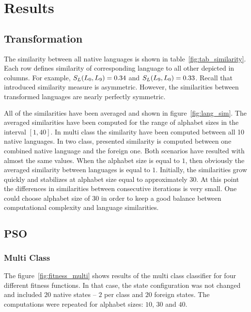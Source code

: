 \documentclass{mini}
\begin{document}
\chapter{Results}\label{chap:results}


\section{Transformation}

The similarity between all native languages is shown in table~\ref{fig:tab_similarity}. Each row defines similarity of corresponding language to all other depicted in columns. For example, $S_{L}(L_0,L_9) = 0.34$ and $S_{L}(L_9,L_0) = 0.33$. Recall that introduced similarity measure is asymmetric. However, the similarities between transformed languages are nearly perfectly symmetric.

\makeTableMutualSimilarites

All of the similarities have been averaged and shown in figure~\ref{fig:lang_sim}. The averaged similarities have been computed for the range of alphabet sizes in the interval $[1, 40]$. In multi class the similarity have been computed between all 10 native languages. In two class, presented similarity is computed between one combined native language and the foreign one. Both scenarios have resulted with almost the same values. When the alphabet size is equal to $1$, then obviously the averaged similarity between languages is equal to $1$. Initially, the similarities grow quickly and stabilizes at alphabet size equal to approximately $30$. At this point the differences in similarities between consecutive iterations is very small. One could choose alphabet size of $30$ in order to keep a good balance between computational complexity and language similarities.

\makeFigureAvgSimlarity


\section{PSO}


\subsection{Multi Class}

The figure~\ref{fig:fitness_multi} shows results of the multi class classifier for four different fitness functions. In that case, the state configuration was not changed and included $20$ native states -- $2$ per class and $20$ foreign states. The computations were repeated for alphabet sizes: $10$, $30$ and $40$.
\end{document}
